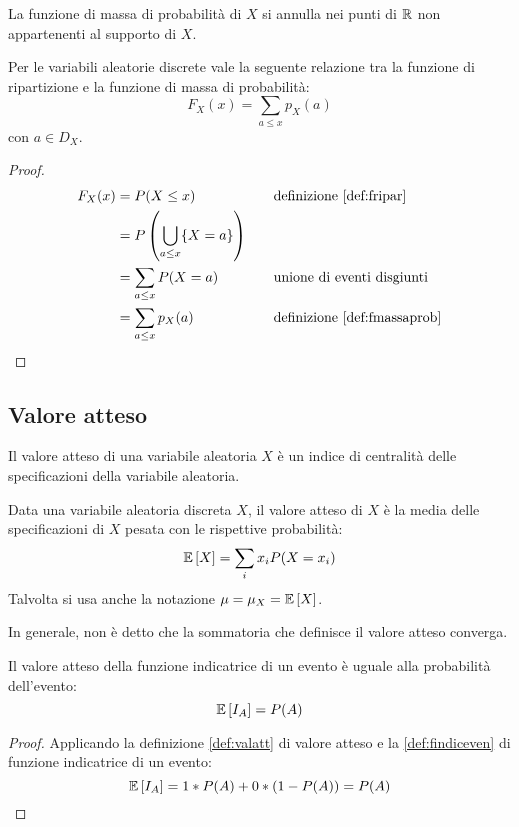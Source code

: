 La funzione di massa di probabilità di $X$ si annulla nei punti di $\mathbb R$ non appartenenti al supporto di $X$.

\begin{prop}
	Per le variabili aleatorie discrete vale la seguente relazione tra la funzione di ripartizione e la funzione di massa di probabilità:
	\begin{equation*}
		F_X(x)=\sum_{a\leq x} p_X(a)
	\end{equation*}
	con $a\in D_X$.
\end{prop}
\begin{proof}
	\begin{align*}
		F_X(x) & = P(X\leq x)                             & \quad & \text{definizione \ref{def:fripar}}     \\
		       & = P\left(\bigcup_{a\leq x}\{X=a\}\right)                                       \\
		       & = \sum_{a\leq x} P(X=a)                  & \quad & \text{unione di eventi disgiunti}       \\
		       & = \sum_{a\leq x} p_X(a)                  & \quad & \text{definizione \ref{def:fmassaprob}}
	\end{align*}
\end{proof}



\subsection{Valore atteso}
Il valore atteso di una variabile aleatoria $X$ è un indice di centralità delle specificazioni della variabile aleatoria.
\begin{defin} \label{def:valatt}
	Data una variabile aleatoria discreta $X$, il valore atteso di $X$ è la media delle specificazioni di $X$ pesata con le rispettive probabilità:
	\begin{equation*}
		\mathbb{E}\left[ X \right]=\sum_i x_i P(X=x_i)
	\end{equation*}
	Talvolta si usa anche la notazione $\mu=\mu_X=\mathbb{E}\left[ X \right]$.
\end{defin}
\noindent
In generale, non è detto che la sommatoria che definisce il valore atteso converga.

\begin{prop} \label{prop:indvalatt}
	Il valore atteso della funzione indicatrice di un evento è uguale alla probabilità dell'evento:
	\begin{equation*}
		\mathbb{E}\left[ I_A \right]=P(A)
	\end{equation*}
\end{prop}
\begin{proof}
	Applicando la definizione \ref{def:valatt} di valore atteso e la \ref{def:findiceven} di funzione indicatrice di un evento:
	\begin{equation*}
		\mathbb{E}\left[ I_A \right]=1*P(A)+0*(1-P(A))=P(A)
	\end{equation*}
\end{proof}

